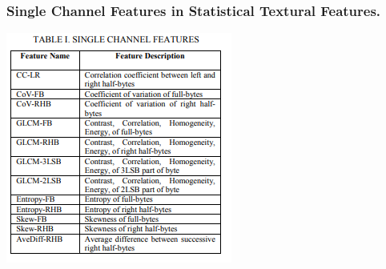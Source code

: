 \documentclass{beamer} %
\theoremstyle{definition} %
\begin{document}
\begin{frame}
\frametitle{Single Channel Features in Statistical Textural Features.}
\includegraphics[scale=1.0]{singleChannelFeatures.png}
\end{frame}
\end{document}
